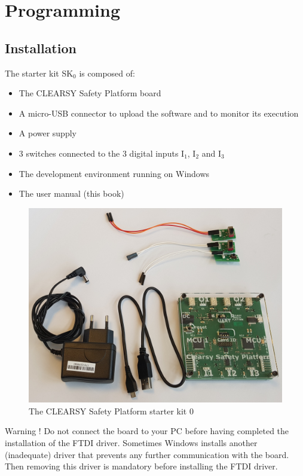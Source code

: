 \chapter{Programming}

\section{Installation}

The starter kit SK$_0$ is composed of: 
\begin{itemize}
    \item The CLEARSY Safety Platform board
    \item A micro-USB connector to upload the software and to monitor its execution
    \item A power supply
    \item 3 switches connected to the 3 digital inputs I$_1$, I$_2$ and I$_3$
    \item The development environment running on Windows
    \item The user manual (this book)
\end{itemize}

\begin{figure}[ht]
\centering\includegraphics[scale=0.09]{Pictures/chapterProgramming/INSTALL-SK0.jpg}
\caption{The CLEARSY Safety Platform starter kit 0}
\label{install:SK0}
\end{figure}

\begin{remark}
Warning ! Do not connect the board to your PC before having completed the installation of the FTDI driver. Sometimes Windows installs another (inadequate) driver that prevents any further communication with the board. Then removing this driver is mandatory before installing the FTDI driver.
\end{remark}

